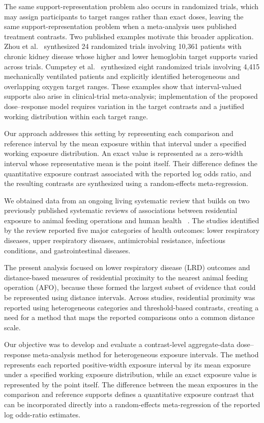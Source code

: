 \documentclass[journal=rsm]{CUP-JNL-DTM}%
\theoremstyle{definition}
\numberwithin{equation}{section}
\begin{document}
The same support-representation problem also occurs in randomized trials, which may
assign participants to target ranges rather than exact doses, leaving the same
support-representation problem when a meta-analysis uses published treatment
contrasts. Two published examples motivate this broader application. Zhou et
al.~\cite{Jing2012} synthesized 24 randomized trials involving 10,361 patients
with chronic kidney disease whose higher and lower hemoglobin target supports
varied across trials. Cumpstey et al.~\cite{Cumpstey2022} synthesized eight
randomized trials involving 4,415 mechanically ventilated patients and
explicitly identified heterogeneous and overlapping oxygen target ranges.
These examples show that interval-valued supports also arise in clinical-trial
meta-analysis; implementation of the proposed dose--response model requires
variation in the target contrasts and a justified working distribution within
each target range.

Our approach addresses this setting by representing each comparison and
reference interval by the mean exposure within that interval under a
specified working exposure distribution. An exact value is represented as a zero-width interval whose representative mean is the point itself. Their difference defines the
quantitative exposure contrast associated with the reported log odds ratio,
and the resulting contrasts are synthesized using a random-effects
meta-regression.

We obtained data from an ongoing living systematic review that builds on two
previously published systematic reviews of associations between residential
exposure to animal feeding operations and human health
~\cite{OConnor_A_M2010,OConnor_A_M2017,Martinez2026,FonsecaMartinezDAG2026}. The studies identified by the review reported five major categories of health outcomes: lower respiratory diseases, upper respiratory diseases, antimicrobial resistance, infectious conditions, and gastrointestinal diseases.

The present analysis focused on lower respiratory disease (LRD) outcomes and
distance-based measures of residential proximity to the nearest animal feeding
operation (AFO), because these formed the largest subset of evidence that could
be represented using distance intervals. Across studies, residential proximity
was reported using heterogeneous categories and threshold-based contrasts,
creating a need for a method that maps the reported comparisons onto a common
distance scale.

Our objective was to develop and evaluate a contrast-level aggregate-data dose--response meta-analysis method for heterogeneous exposure intervals. The method represents each reported positive-width exposure interval by its mean exposure
under a specified working exposure distribution, while an exact exposure value is represented by the point itself. The difference between the
mean exposures in the comparison and reference supports defines a
quantitative exposure contrast that can be incorporated directly into a
random-effects meta-regression of the reported log odds-ratio estimates.
\end{document}
